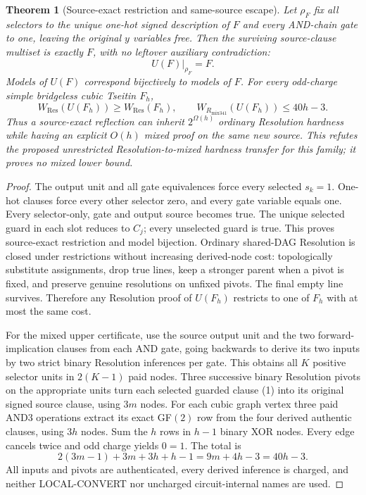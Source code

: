 \documentclass{article}
\newtheorem{theorem}{Theorem}
\begin{document}
\begin{theorem}[Source-exact restriction and same-source escape]
Let $\rho_F$ fix all selectors to the unique one-hot signed description of $F$ and every AND-chain gate to one, leaving the original $y$ variables free. Then the surviving source-clause multiset is \emph{exactly} $F$, with no leftover auxiliary contradiction:
\[
U(F)|_{\rho_F}=F.
\]
Models of $U(F)$ correspond bijectively to models of $F$. For every odd-charge simple bridgeless cubic Tseitin $F_h$,
\[
\boxed{
W_{\mathrm{Res}}(U(F_h))\ge W_{\mathrm{Res}}(F_h),\qquad
W_{R_{\mathrm{mix341}}}(U(F_h))\le40h-3.}
\]
Thus a source-exact reflection can inherit $2^{\Omega(h)}$ ordinary Resolution hardness while having an explicit $O(h)$ mixed proof on the \emph{same new source}. This refutes the proposed unrestricted Resolution-to-mixed hardness transfer for this family; it proves no mixed lower bound.
\end{theorem}
\begin{proof}
The output unit and all gate equivalences force every selected $s_k=1$. One-hot clauses force every other selector zero, and every gate variable equals one. Every selector-only, gate and output source becomes true. The unique selected guard in each slot reduces to $C_j$; every unselected guard is true. This proves source-exact restriction and model bijection. Ordinary shared-DAG Resolution is closed under restrictions without increasing derived-node cost: topologically substitute assignments, drop true lines, keep a stronger parent when a pivot is fixed, and preserve genuine resolutions on unfixed pivots. The final empty line survives. Therefore any Resolution proof of $U(F_h)$ restricts to one of $F_h$ with at most the same cost.

For the mixed upper certificate, use the source output unit and the two forward-implication clauses from each AND gate, going backwards to derive its two inputs by two strict binary Resolution inferences per gate. This obtains all $K$ positive selector units in $2(K-1)$ paid nodes. Three successive binary Resolution pivots on the appropriate units turn each selected guarded clause (1) into its original signed source clause, using $3m$ nodes. For each cubic graph vertex three paid AND3 operations extract its exact GF$(2)$ row from the four derived authentic clauses, using $3h$ nodes. Sum the $h$ rows in $h-1$ binary XOR nodes. Every edge cancels twice and odd charge yields $0=1$. The total is
\[
2(3m-1)+3m+3h+h-1=9m+4h-3=40h-3.
\]
All inputs and pivots are authenticated, every derived inference is charged, and neither LOCAL-CONVERT nor uncharged circuit-internal names are used.
\end{proof}
\end{document}
